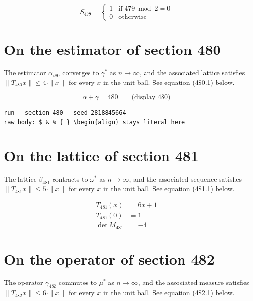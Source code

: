\documentclass{article}
\begin{document}
\begin{equation}
S_{479} = \begin{cases} 1 & \text{if } 479 \bmod 2 = 0 \\ 0 & \text{otherwise} \end{cases}
\end{equation}

\section{On the estimator of section 480}
The estimator $\alpha_{480}$ converges to $\gamma^{*}$ as $n \to \infty$,
and the associated lattice satisfies $\|T_{480} x\| \leq 4 \cdot \|x\|$
for every $x$ in the unit ball. See equation (480.1) below.

$$
\alpha + \gamma = 480 \qquad \text{(display 480)}
$$

\begin{verbatim}
run --section 480 --seed 2818845664
raw body: $ & % { } \begin{align} stays literal here
\end{verbatim}

\section{On the lattice of section 481}
The lattice $\beta_{481}$ contracts to $\omega^{*}$ as $n \to \infty$,
and the associated sequence satisfies $\|T_{481} x\| \leq 5 \cdot \|x\|$
for every $x$ in the unit ball. See equation (481.1) below.

\begin{align}
T_{481}(x) &= 6 x + 1 \\
T_{481}(0) &= 1 \\
\det M_{481} &= -4
\end{align}

\section{On the operator of section 482}
The operator $\gamma_{482}$ commutes to $\mu^{*}$ as $n \to \infty$,
and the associated measure satisfies $\|T_{482} x\| \leq 6 \cdot \|x\|$
for every $x$ in the unit ball. See equation (482.1) below.
\end{document}
